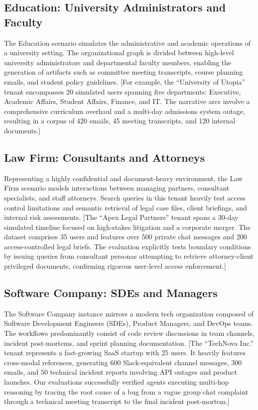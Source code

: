 \documentclass[journal,dvipsnames]{acmart}
\begin{document}
\subsection{Education: University Administrators and Faculty}
The Education scenario simulates the administrative and academic operations of a university setting. The organizational graph is divided between high-level university administrators and departmental faculty members, enabling the generation of artifacts such as committee meeting transcripts, course planning emails, and student policy guidelines.
[For example, the ``University of Utopia'' tenant encompasses 20 simulated users spanning five departments: Executive, Academic Affairs, Student Affairs, Finance, and IT. The narrative arcs involve a comprehensive curriculum overhaul and a multi-day admissions system outage, resulting in a corpus of 420 emails, 45 meeting transcripts, and 120 internal documents.]

\subsection{Law Firm: Consultants and Attorneys}
Representing a highly confidential and document-heavy environment, the Law Firm scenario models interactions between managing partners, consultant specialists, and staff attorneys. Search queries in this tenant heavily test access control limitations and semantic retrieval of legal case files, client briefings, and internal risk assessments.
[The ``Apex Legal Partners'' tenant spans a 30-day simulated timeline focused on high-stakes litigation and a corporate merger. The dataset comprises 35 users and features over 500 private chat messages and 200 access-controlled legal briefs. The evaluation explicitly tests boundary conditions by issuing queries from consultant personas attempting to retrieve attorney-client privileged documents, confirming rigorous user-level access enforcement.]

\subsection{Software Company: SDEs and Managers}
The Software Company instance mirrors a modern tech organization composed of Software Development Engineers (SDEs), Product Managers, and DevOps teams. The workflows predominantly consist of code review discussions in team channels, incident post-mortems, and sprint planning documentation.
[The ``TechNova Inc.'' tenant represents a fast-growing SaaS startup with 25 users. It heavily features cross-modal references, generating 600 Slack-equivalent channel messages, 300 emails, and 50 technical incident reports involving API outages and product launches. Our evaluations successfully verified agents executing multi-hop reasoning by tracing the root cause of a bug from a vague group chat complaint through a technical meeting transcript to the final incident post-mortem.]
\end{document}
